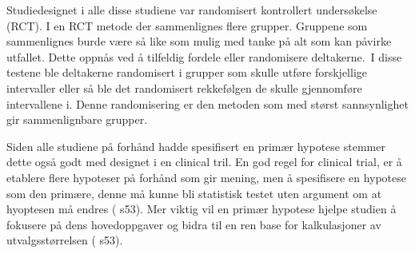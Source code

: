 \documentclass[
]{book}
\begin{document}
Studiedesignet i alle disse studiene var randomisert kontrollert undersøkelse (RCT). I en RCT metode der sammenlignes flere grupper. Gruppene som sammenlignes burde være så like som mulig med tanke på alt som kan påvirke utfallet. Dette oppnås ved å tilfeldig fordele eller randomisere deltakerne.~I disse testene ble deltakerne randomisert i grupper som skulle utføre forskjellige intervaller eller så ble det randomisert rekkefølgen de skulle gjennomføre intervallene i. Denne randomisering er den metoden som med størst sannsynlighet gir sammenlignbare grupper.

Siden alle studiene på forhånd hadde spesifisert en primær hypotese stemmer dette også godt med designet i en clinical tril. En god regel for clinical trial, er å etablere flere hypoteser på forhånd som gir mening, men å spesifisere en hypotese som den primære, denne må kunne bli statistisk testet uten argument om at hyoptesen må endres (\citet{hulley2013} s53). Mer viktig vil en primær hypotese hjelpe studien å fokusere på dens hovedoppgaver og bidra til en ren base for kalkulasjoner av utvalgsstørrelsen (\citet{hulley2013} s53).
\end{document}
